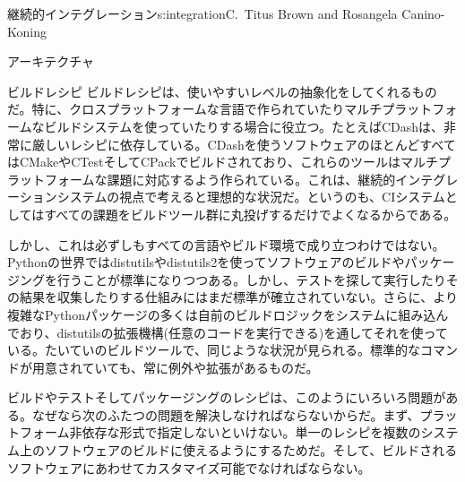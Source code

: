 \begin{aosachapter}{継続的インテグレーション}{s:integration}{C.\ Titus Brown and Rosangela Canino-Koning}
\begin{aosasect1}{アーキテクチャ}
\begin{aosasect2}{ビルドレシピ}
ビルドレシピは、使いやすいレベルの抽象化をしてくれるものだ。特に、クロスプラットフォームな言語で作られていたりマルチプラットフォームなビルドシステムを使っていたりする場合に役立つ。たとえばCDashは、非常に厳しいレシピに依存している。CDashを使うソフトウェアのほとんどすべてはCMakeやCTestそしてCPackでビルドされており、これらのツールはマルチプラットフォームな課題に対応するよう作られている。これは、継続的インテグレーションシステムの視点で考えると理想的な状況だ。というのも、CIシステムとしてはすべての課題をビルドツール群に丸投げするだけでよくなるからである。

しかし、これは必ずしもすべての言語やビルド環境で成り立つわけではない。Pythonの世界ではdistutilsやdistutils2を使ってソフトウェアのビルドやパッケージングを行うことが標準になりつつある。しかし、テストを探して実行したりその結果を収集したりする仕組みにはまだ標準が確立されていない。さらに、より複雑なPythonパッケージの多くは自前のビルドロジックをシステムに組み込んでおり、distutilsの拡張機構(任意のコードを実行できる)を通してそれを使っている。たいていのビルドツールで、同じような状況が見られる。標準的なコマンドが用意されていても、常に例外や拡張があるものだ。

ビルドやテストそしてパッケージングのレシピは、このようにいろいろ問題がある。なぜなら次のふたつの問題を解決しなければならないからだ。まず、プラットフォーム非依存な形式で指定しないといけない。単一のレシピを複数のシステム上のソフトウェアのビルドに使えるようにするためだ。そして、ビルドされるソフトウェアにあわせてカスタマイズ可能でなければならない。


\end{aosasect2}
\end{aosasect1}
\end{aosachapter}
